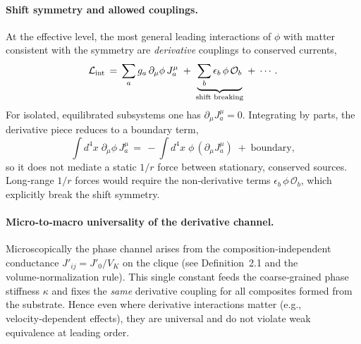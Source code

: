 \documentclass[11pt]{article}
\begin{document}
\paragraph{Shift symmetry and allowed couplings.} At the effective level, the most general leading interactions of $\phi$ with matter consistent with the symmetry are \emph{derivative} couplings to conserved currents,
\begin{equation}
  \mathcal L_{\rm int} \,=\, \sum_a g_a\, \partial_\mu\phi\, J_a^\mu \; +\; \underbrace{\sum_b \epsilon_b\, \phi\, \mathcal O_b}_{\text{shift breaking}} \; +\; \cdots\,.
  \label{eq:Lint-phi}
\end{equation}
For isolated, equilibrated subsystems one has $\partial_\mu J_a^\mu=0$. Integrating by parts, the derivative piece reduces to a boundary term,
\begin{equation}
  \int d^4x\; \partial_\mu\phi\, J_a^\mu \,=\, -\int d^4x\; \phi\, (\partial_\mu J_a^\mu) \; +\; \text{boundary},
\end{equation}
so it does not mediate a static $1/r$ force between stationary, conserved sources. Long‑range $1/r$ forces would require the non‑derivative terms $\epsilon_b\, \phi\, \mathcal O_b$, which explicitly break the shift symmetry.

\paragraph{Micro‑to‑macro universality of the derivative channel.} Microscopically the phase channel arises from the composition‑independent conductance $J'_{ij}=J'_0/V_K$ on the clique (see Definition~2.1 and the volume‑normalization rule). This single constant feeds the coarse‑grained phase stiffness $\kappa$ and fixes the \emph{same} derivative coupling for all composites formed from the substrate. Hence even where derivative interactions matter (e.g., velocity‑dependent effects), they are universal and do not violate weak equivalence at leading order.
\end{document}
